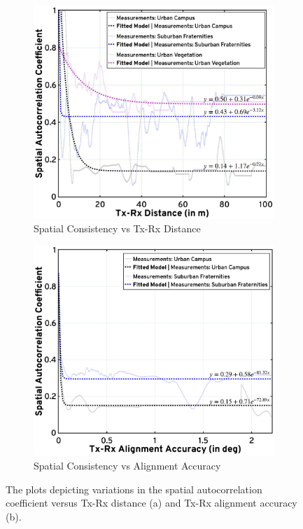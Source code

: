 \documentclass[10pt, twocolumn]{IEEEtran}
\begin{document}
\begin{figure} [t]
     \centering
     \begin{subfigure}{0.496\linewidth}
         \centering
         \includegraphics[width=0.815\linewidth]{figs/sc_distance_annotated.jpg}
         \caption{Spatial Consistency vs Tx-Rx Distance}
         \label{F7a}
     \end{subfigure}
     \begin{subfigure}{0.496\linewidth}
         \centering
         \includegraphics[width=0.825\linewidth]{figs/sc_alignment_annotated.jpg}
         \caption{Spatial Consistency vs Alignment Accuracy}
         \label{F7b}
     \end{subfigure}
     \vspace{-5mm}
     \caption{The plots depicting variations in the spatial autocorrelation coefficient versus Tx-Rx distance (a) and Tx-Rx alignment accuracy (b).}
     \label{F7}
     \vspace{-7mm}
\end{figure}
\vspace{-12mm}
\end{document}
